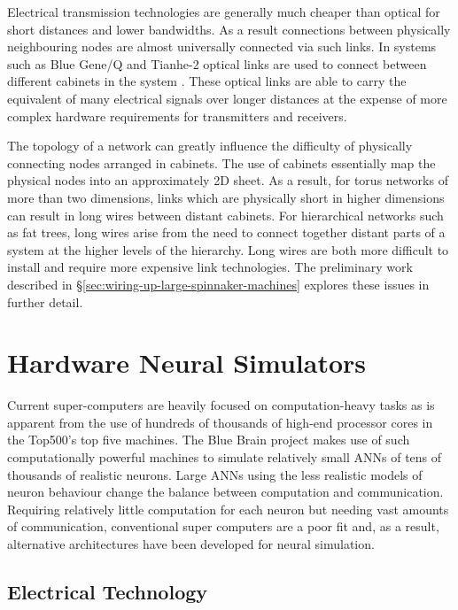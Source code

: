 			Electrical transmission technologies are generally much cheaper than
			optical for short distances and lower bandwidths. As a result connections
			between physically neighbouring nodes are almost universally connected via
			such links. In systems such as Blue Gene/Q and Tianhe-2 optical links are
			used to connect between different cabinets in the system
			\cite{dongarra13,prickett10}. These optical links are able to carry the
			equivalent of many electrical signals over longer distances at the expense
			of more complex hardware requirements for transmitters and receivers.
			
			The topology of a network can greatly influence the difficulty of
			physically connecting nodes arranged in cabinets. The use of cabinets
			essentially map the physical nodes into an approximately 2D sheet. As a
			result, for torus networks of more than two dimensions, links which are
			physically short in higher dimensions can result in long wires between
			distant cabinets. For hierarchical networks such as fat trees, long wires
			arise from the need to connect together distant parts of a system at the
			higher levels of the hierarchy. Long wires are both more difficult to
			install and require more expensive link technologies. The preliminary work
			described in \S\ref{sec:wiring-up-large-spinnaker-machines} explores these
			issues in further detail.
	
	\section{Hardware Neural Simulators}
		
		Current super-computers are heavily focused on computation-heavy tasks as is
		apparent from the use of hundreds of thousands of high-end processor cores
		in the Top500's top five machines. The Blue Brain project \cite{markram06}
		makes use of such computationally powerful machines to simulate relatively
		small ANNs of tens of thousands of realistic neurons. Large ANNs using the
		less realistic models of neuron behaviour change the balance between
		computation and communication.  Requiring relatively little computation for
		each neuron but needing vast amounts of communication, conventional super
		computers are a poor fit and, as a result, alternative architectures have
		been developed for neural simulation.
		
		\subsection{Electrical Technology}
		
